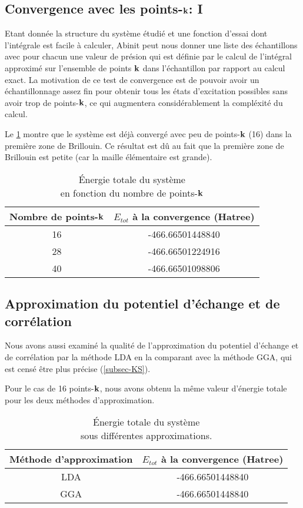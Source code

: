 \subsection{Convergence avec les points-$\vb{k}$: I}
Etant donnée la structure du système étudié et une fonction d'essai dont l'intégrale est facile à calculer,
Abinit peut nous donner une liste des échantillons avec pour chacun une valeur de présion
qui est définie par le calcul de l'intégral approximé sur l'ensemble de points $\vb{k}$ dans l'échantillon
par rapport au calcul exact.
La motivation de ce test de convergence est de pouvoir avoir un échantillonnage
assez fin pour obtenir tous les états d'excitation possibles sans avoir trop de points-$\vb{k}$,
ce qui augmentera considérablement la compléxité du calcul.

Le \cref{tab-etotPK} montre que le système est déjà convergé avec peu de points-$\vb{k}$ (16) dans la première zone de Brillouin.
Ce résultat est dû au fait que la première zone de Brillouin est petite (car la maille élémentaire est grande).
\begin{table}[ht]
  \captionsetup{width=0.6\textwidth}
  \caption{Énergie totale du système\\ en fonction du nombre de points-$\vb{k}$}\label{tab-etotPK}
  \centering
  \begin{tabular}{c c}
    \toprule
    Nombre de points-$\vb{k}$  &  $E_{tot}$ à la convergence (Hatree)
    \\
    \midrule
    16    &  -466.66501448840
    \\
    28    &  -466.66501224916
    \\
    40    &  -466.66501098806
    \\
    \bottomrule
  \end{tabular}
\end{table}

\subsection{Approximation du potentiel d'échange et de corrélation}
Nous avons aussi examiné la qualité de l'approximation du potentiel d'échange et de corrélation
par la méthode LDA en la comparant avec la méthode GGA,
qui est censé être plus précise (\cref{subsec-KS}).

Pour le cas de 16 points-$\vb{k}$, nous avons obtenu la même valeur d'énergie totale pour les deux méthodes d'approximation.

\begin{table}[ht]
  \captionsetup{width=0.6\textwidth}
  \caption{Énergie totale du système\\ sous différentes approximations.}\label{tab-LDAGGA}
  \centering
  \begin{tabular}{c c}
    \toprule
    Méthode d'approximation &  $E_{tot}$ à la convergence (Hatree)
    \\
    \midrule
    LDA    &  -466.66501448840
    \\
    GGA   &   -466.66501448840
    \\
    \bottomrule
  \end{tabular}
\end{table}


